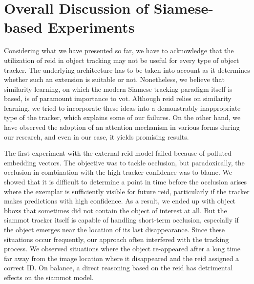 \section{Overall Discussion of Siamese-based Experiments}
\label{sec:ExperimentsDisucssion}

Considering what we have presented so far, we have to acknowledge that the utilization of \gls{reid} in object tracking may not be useful for every type of object tracker. The underlying architecture has to be taken into account as it determines whether such an extension is suitable or not. Nonetheless, we believe that similarity learning, on which the modern Siamese tracking paradigm itself is based, is of paramount importance to \gls{vot}. Although \gls{reid} relies on similarity learning, we tried to incorporate these ideas into a demonstrably inappropriate type of the tracker, which explains some of our failures. On the other hand, we have observed the adoption of an attention mechanism in various forms during our research, and even in our case, it yields promising results.

The first experiment with the external \gls{reid} model failed because of polluted embedding vectors. The objective was to tackle occlusion, but paradoxically, the occlusion in combination with the high tracker confidence was to blame. We showed that it is difficult to determine a point in time before the occlusion arises where the exemplar is sufficiently visible for future \gls{reid}, particularly if the tracker makes predictions with high confidence. As a result, we ended up with object \glspl{bbox} that sometimes did not contain the object of interest at all. But the \gls{siammot} tracker itself is capable of handling short-term occlusion, especially if the object emerges near the location of its last disappearance. Since these situations occur frequently, our approach often interfered with the tracking process. We observed situations where the object re-appeared after a long time far away from the image location where it disappeared and the \gls{reid} assigned a correct ID. On balance, a direct reasoning based on the \gls{reid} has detrimental effects on the \gls{siammot} model.

